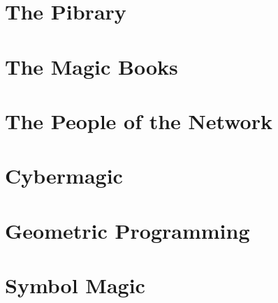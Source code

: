 \documentclass[ebook,12pt,openany]{memoir} %
\begin{document}
\chapter{The Pibrary}

\chapter{The Magic Books}

\chapter{The People of the Network}

\chapter{Cybermagic}

\chapter{Geometric Programming}

\chapter{Symbol Magic}



\end{document}
